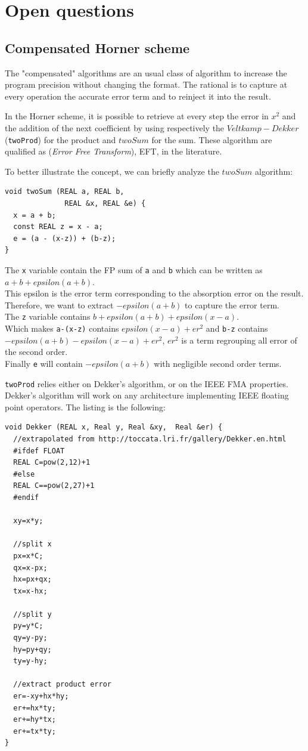 \documentclass{TP}
\begin{document}
\section{Open questions}


\subsection{Compensated Horner scheme}

The "compensated" algorithms are an usual class of algorithm to increase the program precision without changing the format. The rational is to capture at every operation the accurate error term and to reinject it into the result.

In the Horner scheme, it is possible to retrieve at every step the error in $x^2$ and the addition of the next coefficient by using respectively the
$Veltkamp-Dekker$ ({\tt twoProd}) for the product and
$twoSum$ for the sum. These algorithm are qualified as
({\it Error Free Transform}), EFT, in the literature.


To better illustrate the concept, we can briefly analyze the $twoSum$ algorithm:
\begin{lstlisting}[frame=single, style=customC]
void twoSum (REAL a, REAL b,
              REAL &x, REAL &e) {
  x = a + b;
  const REAL z = x - a;
  e = (a - (x-z)) + (b-z);
}
\end{lstlisting}

The {\tt x} variable contain the FP sum of  {\tt a}  and  {\tt b} which can be written as $a+b+epsilon(a+b)$. \\
This epsilon is the error term corresponding to the absorption error on the result. \\
Therefore, we want to extract $ -epsilon(a+b)$ to capture the error term.  \\
The {\tt z} variable contains $b + epsilon(a+b)+epsilon(x-a)$. \\
Which makes {\tt a-(x-z)} contains $epsilon(x-a)+er^2$ and {\tt b-z} contains $-epsilon(a+b)-epsilon(x-a)+er^2$, $er^2$ is a term regrouping all error of the second order. \\
Finally {\tt e} will contain $-epsilon(a+b)$ with negligible second order terms.


{\tt twoProd} relies either on Dekker's algorithm, or on the IEEE FMA properties.
Dekker's algorithm will work on any architecture implementing IEEE floating point operators.
The listing is the following:
\begin{lstlisting}[frame=single, style=customC]
void Dekker (REAL x, Real y, Real &xy,  Real &er) {
  //extrapolated from http://toccata.lri.fr/gallery/Dekker.en.html
  #ifdef FLOAT
  REAL C=pow(2,12)+1
  #else
  REAL C==pow(2,27)+1
  #endif

  xy=x*y;

  //split x
  px=x*C;
  qx=x-px;
  hx=px+qx;
  tx=x-hx;

  //split y
  py=y*C;
  qy=y-py;
  hy=py+qy;
  ty=y-hy;

  //extract product error
  er=-xy+hx*hy;
  er+=hx*ty;
  er+=hy*tx;
  er+=tx*ty;
}
\end{lstlisting}
\end{document}
